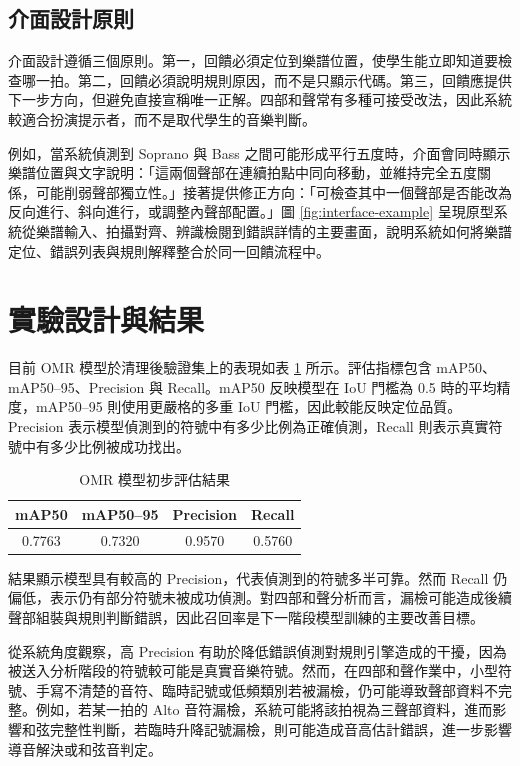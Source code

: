 \documentclass[12pt,a4paper]{article}
\begin{document}
\subsection{介面設計原則}

介面設計遵循三個原則。第一，回饋必須定位到樂譜位置，使學生能立即知道要檢查哪一拍。第二，回饋必須說明規則原因，而不是只顯示代碼。第三，回饋應提供下一步方向，但避免直接宣稱唯一正解。四部和聲常有多種可接受改法，因此系統較適合扮演提示者，而不是取代學生的音樂判斷。

例如，當系統偵測到 Soprano 與 Bass 之間可能形成平行五度時，介面會同時顯示樂譜位置與文字說明：「這兩個聲部在連續拍點中同向移動，並維持完全五度關係，可能削弱聲部獨立性。」接著提供修正方向：「可檢查其中一個聲部是否能改為反向進行、斜向進行，或調整內聲部配置。」圖 \ref{fig:interface-example} 呈現原型系統從樂譜輸入、拍攝對齊、辨識檢閱到錯誤詳情的主要畫面，說明系統如何將樂譜定位、錯誤列表與規則解釋整合於同一回饋流程中。

\section{實驗設計與結果}

目前 OMR 模型於清理後驗證集上的表現如表 \ref{tab:performance} 所示。評估指標包含 mAP50、mAP50--95、Precision 與 Recall。mAP50 反映模型在 IoU 門檻為 0.5 時的平均精度，mAP50--95 則使用更嚴格的多重 IoU 門檻，因此較能反映定位品質。Precision 表示模型偵測到的符號中有多少比例為正確偵測，Recall 則表示真實符號中有多少比例被成功找出。

\begin{table}[htbp]
  \centering
  \caption{OMR 模型初步評估結果}
  \label{tab:performance}
  \begin{tabular}{cccc}
    \toprule
    mAP50 & mAP50--95 & Precision & Recall \\
    \midrule
    0.7763 & 0.7320 & 0.9570 & 0.5760 \\
    \bottomrule
  \end{tabular}
\end{table}

結果顯示模型具有較高的 Precision，代表偵測到的符號多半可靠。然而 Recall 仍偏低，表示仍有部分符號未被成功偵測。對四部和聲分析而言，漏檢可能造成後續聲部組裝與規則判斷錯誤，因此召回率是下一階段模型訓練的主要改善目標。

從系統角度觀察，高 Precision 有助於降低錯誤偵測對規則引擎造成的干擾，因為被送入分析階段的符號較可能是真實音樂符號。然而，在四部和聲作業中，小型符號、手寫不清楚的音符、臨時記號或低頻類別若被漏檢，仍可能導致聲部資料不完整。例如，若某一拍的 Alto 音符漏檢，系統可能將該拍視為三聲部資料，進而影響和弦完整性判斷，若臨時升降記號漏檢，則可能造成音高估計錯誤，進一步影響導音解決或和弦音判定。
\end{document}

